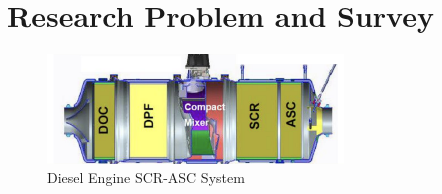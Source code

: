 \chapter{Research Problem and Survey}
\begin{figure}[H]
        \centering
        \includegraphics[width = 0.7\textwidth]{Part3/figs/SCR-ASC_chamber.png}
        \caption{Diesel Engine SCR-ASC System}
        \label{fig::scr_chamber}
\end{figure}

